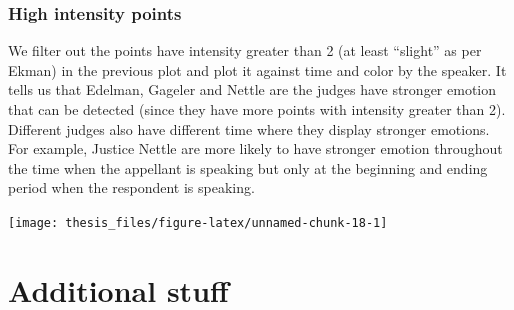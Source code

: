 \documentclass{monashthesis}
\begin{document}
\hypertarget{high-intensity-points}{%
\subsection{High intensity points}\label{high-intensity-points}}

We filter out the points have intensity greater than 2 (at least ``slight'' as per Ekman) in the previous plot and plot it against time and color by the speaker. It tells us that Edelman, Gageler and Nettle are the judges have stronger emotion that can be detected (since they have more points with intensity greater than 2). Different judges also have different time where they display stronger emotions. For example, Justice Nettle are more likely to have stronger emotion throughout the time when the appellant is speaking but only at the beginning and ending period when the respondent is speaking.

\texttt{[image: thesis\_files/figure-latex/unnamed-chunk-18-1]}

\appendix

\hypertarget{additional-stuff}{%
\chapter{Additional stuff}\label{additional-stuff}}
\end{document}

